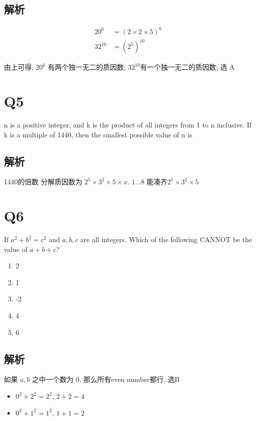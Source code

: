   \subsection{解析}

    \begin{align*}
      20^{6} &= \left( 2 \times 2 \times 5 \right)^{6} \\
      32^{10} &= \left( 2^{5} \right)^{10}
    \end{align*}

    由上可得, $ 20^{6} $ 有两个独一无二的质因数; $ 32^{10} $有一个独一无二的质因数;
    选 A

\section{Q5}

  n is a positive integer, and k is the product of all integers from 1 to n
  inclusive. If k is a multiple of 1440, then the smallest possible value of n
  is

  \subsection{解析}

    1440的倍数 分解质因数为 $ 2^{5} \times 3^{2} \times 5 \times x $. $ 1...8 $
    能凑齐$ 2^{5} \times 3^{2} \times 5 $

\section{Q6}

  If $ a^{2} + b^{2} = c^{2} $ and $ a, b, c $ are all integers. Which of the
  following CANNOT be the value of $ a + b + c $?

  \begin{enumerate}
    \item 2
    \item 1
    \item -2
    \item 4
    \item 6
  \end{enumerate}

  \subsection{解析}

    如果 $ a, b $ 之中一个数为 $ 0 $, 那么所有even number都行, 选B

    \begin{itemize}
      \item $ 0^{2} + 2^{2} = 2^{2} $, $ 2 + 2 = 4 $
      \item $ 0^{2} + 1^{2} = 1^{2} $, $ 1 + 1 = 2 $
    \end{itemize}

